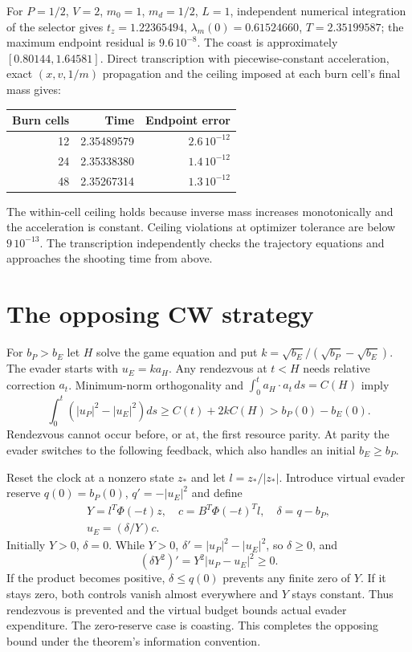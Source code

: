 For $P=1/2$, $V=2$, $m_0=1$, $m_d=1/2$, $L=1$, independent numerical
integration of the selector gives
$t_z=1.22365494$, $\lambda_m(0)=0.61524660$, $T=2.35199587$;
the maximum endpoint residual is $9.6\,10^{-8}$. The coast is approximately
$[0.80144,1.64581]$. Direct transcription with piecewise-constant
acceleration, exact $(x,v,1/m)$ propagation and the ceiling imposed at
each burn cell's final mass gives:
\begin{center}\begin{tabular}{rrr}\toprule
Burn cells&Time&Endpoint error\\\midrule
12&2.35489579&$2.6\,10^{-12}$\\
24&2.35338380&$1.4\,10^{-12}$\\
48&2.35267314&$1.3\,10^{-12}$\\\bottomrule
\end{tabular}\end{center}
The within-cell ceiling holds because inverse mass increases monotonically
and the acceleration is constant. Ceiling violations at optimizer tolerance
are below $9\,10^{-13}$. The transcription independently checks the
trajectory equations and approaches the shooting time from above.

\section{The opposing CW strategy}
\label{app:game}
For $b_P>b_E$ let $H$ solve the game equation and put
$k=\sqrt{b_E}/(\sqrt{b_P}-\sqrt{b_E})$.
The evader starts with $u_E=ka_H$.
Any rendezvous at $t<H$ needs relative correction $a_t$.
Minimum-norm orthogonality and
$\int_0^t a_H\cdot a_t\,ds=C(H)$ imply
\begin{equation}
 \int_0^t(|u_P|^2-|u_E|^2)ds
 \ge C(t)+2kC(H)>b_P(0)-b_E(0).
\end{equation}
Rendezvous cannot occur before, or at, the first resource parity.
At parity the evader switches to the following feedback, which also
handles an initial $b_E\ge b_P$.

Reset the clock at a nonzero state $z_*$ and let
$l=z_*/|z_*|$. Introduce virtual evader reserve
$q(0)=b_P(0)$, $q'=-|u_E|^2$ and define
\begin{equation}
 \begin{gathered}
 Y=l^T\Phi(-t)z,\quad
 c=B^T\Phi(-t)^Tl,\quad \delta=q-b_P,\\
 u_E=(\delta/Y)c.
 \end{gathered}
\end{equation}
Initially $Y>0$, $\delta=0$. While $Y>0$,
$\delta'=|u_P|^2-|u_E|^2$, so $\delta\ge0$, and
\begin{equation}
 (\delta Y^2)'=Y^2|u_P-u_E|^2\ge0.
\end{equation}
If the product becomes positive, $\delta\le q(0)$ prevents any
finite zero of $Y$. If it stays zero, both controls vanish almost
everywhere and $Y$ stays constant. Thus rendezvous is prevented
and the virtual budget bounds actual evader expenditure.
The zero-reserve case is coasting. This completes the opposing
bound under the theorem's information convention.

